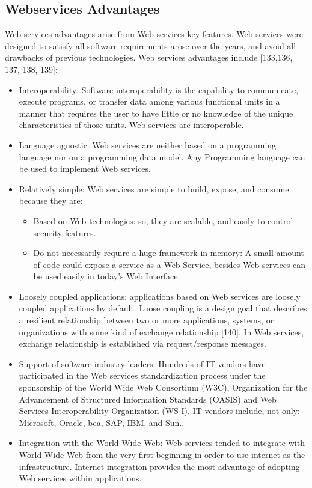 \documentclass[12pt,a4paper,final,twoside,onecolumn,titlepage]{book}
\begin{document}
\subsection{Webservices Advantages}
Web services advantages arise from Web services key features. Web services were designed to satisfy all software requirements arose over the years, and avoid all drawbacks of previous technologies. Web services advantages include [133,136, 137, 138, 139]:
\begin{itemize}
\item Interoperability: Software interoperability is the capability to communicate, execute programs, or transfer data among various functional units in a manner that requires the user to have little or no knowledge of the unique characteristics of those units. Web services are interoperable.
\item Language agnostic: Web services are neither based on a programming language nor on a programming data model. Any Programming language can be used to implement Web services.
\item Relatively simple: Web services are simple to build, expose, and consume because they are:
\begin{itemize}
\item Based on Web technologies: so, they are scalable, and easily to control security features.
\item Do not necessarily require a huge framework in memory: A small amount of code could expose a service as a Web Service, besides Web services can be used easily in today's Web Interface. 
\end{itemize}
\item Loosely coupled applications: applications based on Web services are loosely coupled applications by default. Loose coupling is a design goal that describes a resilient relationship between two or more applications, systems, or organizations with some kind of exchange relationship [140]. In Web services, exchange relationship is established via request/response messages.
\item Support of software industry leaders: Hundreds of IT vendors have participated in the Web services standardization process under the sponsorship of the World Wide Web Consortium (\gls{W3C}), Organization for the Advancement of Structured Information Standards (OASIS) and Web Services Interoperability Organization (WS-I).  IT vendors include, not only: Microsoft, Oracle, bea, SAP, IBM, and Sun..
\item Integration with the World Wide Web: Web services tended to integrate with World Wide Web from the very first beginning in order to use internet as the infrastructure. Internet integration provides the most advantage of adopting Web services within applications.
\end{itemize}
\end{document}
